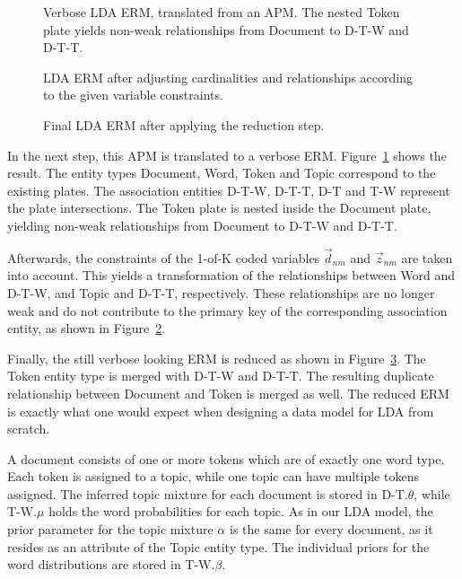 \begin{figure}[p]
\centering
\scalebox{0.5}{\adjustTikzSize }
\caption[Verbose LDA ERM, translated from an APM]{Verbose LDA ERM, translated from an APM. The nested Token plate yields non-weak relationships from Document to D-T-W and D-T-T.}\label{fig:topic_erm_good_verbose}
\end{figure}

\begin{figure}[p]
\centering
\scalebox{0.5}{\adjustTikzSize }
\caption[LDA ERM after taking constraints into account]{LDA ERM after adjusting cardinalities and relationships according to the given variable constraints.}\label{fig:topic_erm_good_constraints}
\end{figure}

\begin{figure}[p]
\centering
\scalebox{0.5}{\adjustTikzSize }
\caption[Final LDA ERM after applying the reduction step]{Final LDA ERM after applying the reduction step.}\label{fig:topic_erm_good_reduced}
\end{figure}

In the next step, this APM is translated to a verbose ERM. Figure~\ref{fig:topic_erm_good_verbose} shows the result. The entity types Document, Word, Token and Topic correspond to the existing plates. The association entities D-T-W, D-T-T, D-T and T-W represent the plate intersections. The Token plate is nested inside the Document plate, yielding non-weak relationships from Document to D-T-W and D-T-T.

Afterwards, the constraints of the 1-of-K coded variables $\vec d_{nm}$ and $\vec z_{nm}$ are taken into account. This yields a transformation of the relationships between Word and D-T-W, and Topic and D-T-T, respectively. These relationships are no longer weak and do not contribute to the primary key of the corresponding association entity, as shown in Figure~\ref{fig:topic_erm_good_constraints}.

Finally, the still verbose looking ERM is reduced as shown in Figure~\ref{fig:topic_erm_good_reduced}. The Token entity type is merged with D-T-W and D-T-T. The resulting duplicate relationship between Document and Token is merged as well. The reduced ERM is exactly what one would expect when designing a data model for LDA from scratch.

A document consists of one or more tokens which are of exactly one word type. Each token is assigned to a topic, while one topic can have multiple tokens assigned. The inferred topic mixture for each document is stored in D-T.$\theta$, while T-W.$\mu$ holds the word probabilities for each topic. As in our LDA model, the prior parameter for the topic mixture $\alpha$ is the same for every document, as it resides as an attribute of the Topic entity type. The individual priors for the word distributions are stored in T-W.$\beta$.

